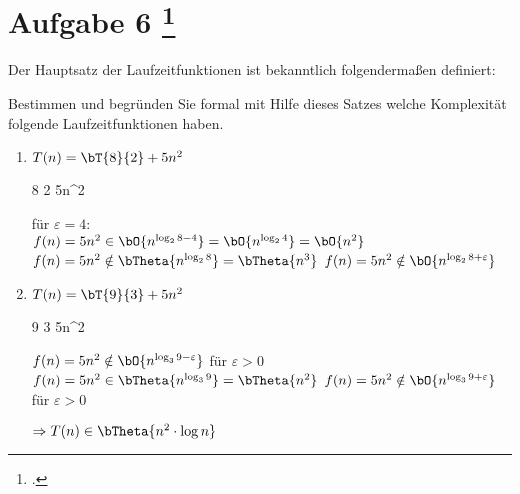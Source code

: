 \documentclass{bschlangaul-aufgabe}
\begin{document}
\let\O=\bO
\let\o=\bOmega
\let\T=\bT
\let\t=\bTheta

\section{Aufgabe 6
\footcite{examen:66115:2019:09}}

Der Hauptsatz der Laufzeitfunktionen ist bekanntlich folgendermaßen
definiert:

\bMasterFaelle

\noindent
Bestimmen und begründen Sie formal mit Hilfe dieses Satzes welche
Komplexität folgende Laufzeitfunktionen haben.

\begin{enumerate}


\item $T(n) = \T{8}{2} + 5n^2$

\begin{liAntwort}
\bMasterVariablenDeklaration
{8} %
{2} %
{5n^2} %

\bMasterFallRechnung
{für $\varepsilon = 4$: \\
$f(n) = 5n^2 \in \O{n^{\log_2 {8 - 4}}} = \O{n^{\log_2 4}} = \O{n^2}$}
{$f(n) = 5n^2 \notin \t{n^{\log_2 {8}}} = \t{n^3}$}
{$f(n) = 5n^2 \notin \O{n^{\log_2 {8 + \varepsilon}}}$}

\end{liAntwort}


\item $T(n) = \T{9}{3} + 5n^2$

\begin{liAntwort}
\bMasterVariablenDeklaration
{9} %
{3} %
{5n^2} %

\bMasterFallRechnung
{$f(n) = 5n^2 \notin \O{n^{\log_3 {9 - \varepsilon}}}$ für $\varepsilon > 0$}
{$f(n) = 5n^2 \in \t{n^{\log_3 {9}}} = \t{n^2}$}
{$f(n) = 5n^2 \notin \O{n^{\log_3 {9 + \varepsilon}}}$ für $\varepsilon > 0$}

$\Rightarrow T(n) \in \t{n^2 \cdot \log n}$

\end{liAntwort}

\end{enumerate}
\end{document}

